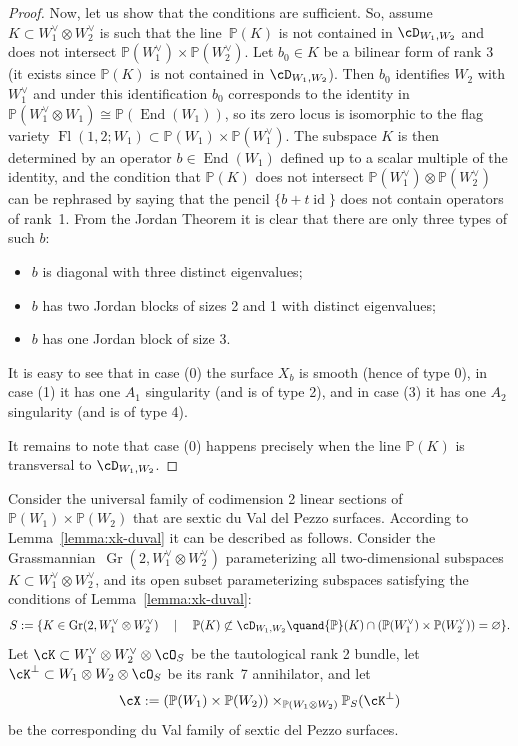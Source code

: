\documentclass[11pt]{amsart}
\renewcommand{\P}{{\mathbb{P}}}
\DeclareMathOperator{\End}{\mathrm{End}}
\DeclareMathOperator{\Gr}{\mathrm{Gr}}
\DeclareMathOperator{\Fl}{\mathrm{Fl}}
\DeclareMathOperator{\id}{\mathrm{id}}
\theoremstyle{plain}
\theoremstyle{definition}
\theoremstyle{remark}
\begin{document}
\begin{proof}
Now, let us show that the conditions are sufficient.
So, assume $K \subset W_1^\vee \otimes W_2^\vee$ is such that the line~$\P(K)$ is not contained in $\cD_{W_1,W_2}$ and does not intersect $\P(W_1^\vee) \times \P(W_2^\vee)$.
Let $b_0 \in K$ be a bilinear form of rank 3 (it exists since $\P(K)$ is not contained in $\cD_{W_1,W_2}$).
Then $b_0$ identifies $W_2$ with $W_1^\vee$ and under this identification $b_0$ corresponds to the identity in $\P(W_1^\vee \otimes W_1) \cong \P(\End(W_1))$, 
so its zero locus is isomorphic to the flag variety $\Fl(1,2;W_1) \subset \P(W_1) \times \P(W_1^\vee)$. 
The subspace $K$ is then determined by an operator $b \in \End(W_1)$ defined up to a scalar multiple of the identity, and the condition that $\P(K)$ does not intersect $\P(W_1^\vee) \otimes \P(W_2^\vee)$
can be rephrased by saying that the pencil $\{b + t\id\}$ does not contain operators of rank~1.
From the Jordan Theorem it is clear that there are only three types of such $b$:
\begin{itemize}
\item[$(0)$]
$b$ is diagonal with three distinct eigenvalues;
\item[$(1)$]
$b$ has two Jordan blocks of sizes 2 and 1 with distinct eigenvalues; 
\item[$(2)$]
$b$ has one Jordan block of size 3.
\end{itemize}
It is easy to see that in case (0) the surface $X_b$ is smooth (hence of type 0), 
in case (1) it has one $A_1$ singularity (and is of type 2), and in case (3) it has one $A_2$ singularity (and is of type 4).

It remains to note that case (0) happens precisely when the line $\P(K)$ is transversal to $\cD_{W_1,W_2}$.
\end{proof}

Consider the universal family of codimension 2 linear sections of $\P(W_1) \times \P(W_2)$ that are sextic du Val del Pezzo surfaces.
According to Lemma~\ref{lemma:xk-duval} it can be described as follows.
Consider the Grassmannian~$\Gr(2,W_1^\vee \otimes W_2^\vee)$ parameterizing all two-dimensional subspaces $K \subset W_1^\vee \otimes W_2^\vee$, 
and its open subset parameterizing subspaces satisfying the conditions of Lemma~\ref{lemma:xk-duval}:
\begin{equation*}
S := \{ K \in \Gr(2,W_1^\vee \otimes W_2^\vee) \quad \mid \quad 
\P(K) \not\subset \cD_{W_1,W_2} \quand \P(K) \cap (\P(W_1^\vee) \times \P(W_2^\vee)) = \varnothing \}.
\end{equation*}
Let $\cK \subset W_1^\vee \otimes W_2^\vee \otimes \cO_S$ be the tautological rank 2 bundle, 
let $\cK^\perp \subset W_1 \otimes W_2 \otimes \cO_S$ be its rank~7 annihilator, and let 
\begin{equation}
\label{eq:cx-p2p2}
\cX := (\P(W_1) \times \P(W_2)) \times_{\P(W_1 \otimes W_2)} \P_S(\cK^\perp)
\end{equation}
be the corresponding du Val family of sextic del Pezzo surfaces.
\end{document}
